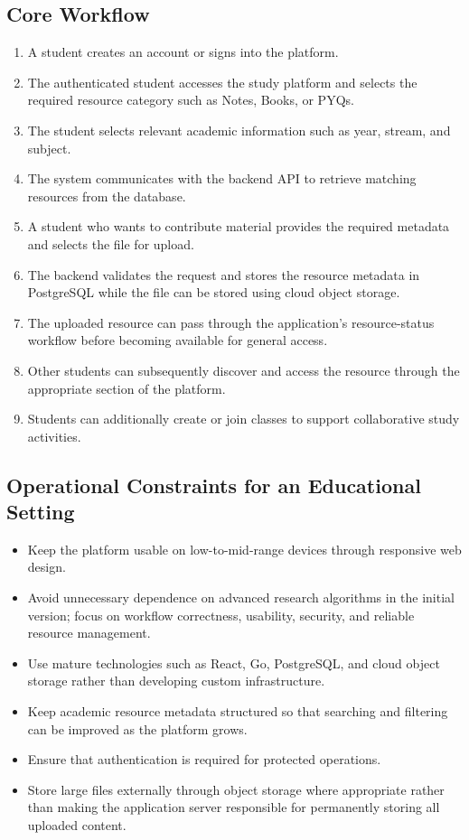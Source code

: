 \documentclass[11pt,a4paper]{article}
\begin{document}
\subsection{Core Workflow}
\begin{enumerate}[leftmargin=*]
    \item A student creates an account or signs into the platform.
    \item The authenticated student accesses the study platform and selects the required resource category such as Notes, Books, or PYQs.
    \item The student selects relevant academic information such as year, stream, and subject.
    \item The system communicates with the backend API to retrieve matching resources from the database.
    \item A student who wants to contribute material provides the required metadata and selects the file for upload.
    \item The backend validates the request and stores the resource metadata in PostgreSQL while the file can be stored using cloud object storage.
    \item The uploaded resource can pass through the application's resource-status workflow before becoming available for general access.
    \item Other students can subsequently discover and access the resource through the appropriate section of the platform.
    \item Students can additionally create or join classes to support collaborative study activities.
\end{enumerate}

\subsection{Operational Constraints for an Educational Setting}
\begin{itemize}[leftmargin=*]
    \item Keep the platform usable on low-to-mid-range devices through responsive web design.
    \item Avoid unnecessary dependence on advanced research algorithms in the initial version; focus on workflow correctness, usability, security, and reliable resource management.
    \item Use mature technologies such as React, Go, PostgreSQL, and cloud object storage rather than developing custom infrastructure.
    \item Keep academic resource metadata structured so that searching and filtering can be improved as the platform grows.
    \item Ensure that authentication is required for protected operations.
    \item Store large files externally through object storage where appropriate rather than making the application server responsible for permanently storing all uploaded content.
\end{itemize}
\end{document}
